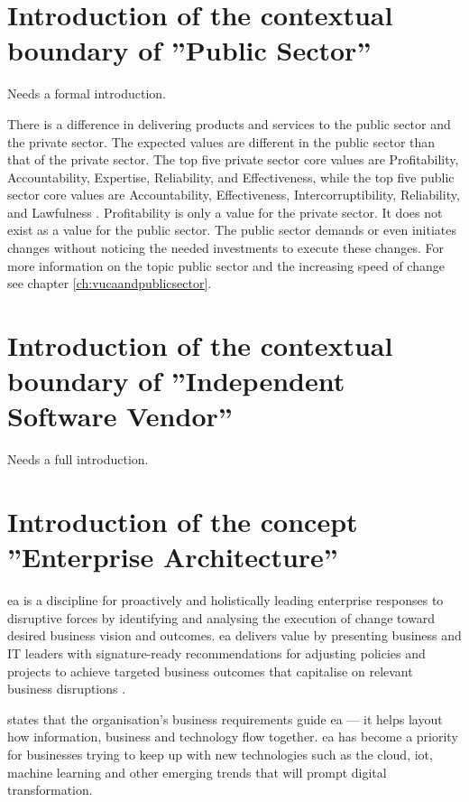 \section{Introduction of the contextual boundary of ''Public Sector''}
\label{sec:intropublicsector}
\begin{remark}
	Needs a formal introduction.
\end{remark}
There is a difference in delivering products and services to the public sector and the private sector. The expected values are different in the public sector than that of the private sector. The top five private sector core values are  Profitability, Accountability, Expertise, Reliability, and Effectiveness, while the top five public sector core values are Accountability, Effectiveness, Intercorruptibility, Reliability, and Lawfulness \parencite{Wal2008}. Profitability is only a value for the private sector. It does not exist as a value for the public sector.  The public sector demands or even initiates changes without noticing the needed investments to execute these changes. For more information on the topic public sector and the increasing speed of change see chapter \ref{ch:vucaandpublicsector}.

\section{Introduction of the contextual boundary of ''Independent Software Vendor''}
\label{sec:introisv}
\begin{remark}
	Needs a full introduction.
\end{remark}

\section{Introduction of the concept ''Enterprise Architecture''}
\label{introea}
\acrfull{ea} is a discipline for proactively and holistically leading enterprise responses to disruptive forces by identifying and analysing the execution of change toward desired business vision and outcomes. \acrshort{ea} delivers value by presenting business and IT leaders with signature-ready recommendations for adjusting policies and projects to achieve targeted business outcomes that capitalise on relevant business disruptions \parencite{Gartner}.\par
\textcite{White2018} states that the organisation’s business requirements guide \acrshort{ea} — it helps layout how information, business and technology flow together. \acrshort{ea} has become a priority for businesses trying to keep up with new technologies such as the cloud, \acrfull{iot}, machine learning and other emerging trends that will prompt digital transformation.

